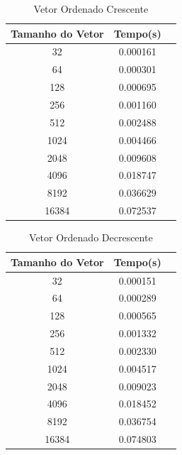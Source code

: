 \documentclass[12pt,a4paper,twoside]{report}
\begin{document}
\begin{table}[h]
  \centering
  \caption{Vetor Ordenado Crescente \label{tab:oc}}
  \begin{tabular}{ccc} \\\hline
  \textbf{Tamanho do Vetor}  & \textbf{Tempo(s)} \\\hline
  32                              & 0.000161          \\\hline
  64                              & 0.000301          \\\hline
  128                             & 0.000695          \\\hline
  256                             & 0.001160          \\\hline
  512                             & 0.002488          \\\hline
  1024                            & 0.004466          \\\hline
  2048                            & 0.009608          \\\hline
  4096                            & 0.018747         \\\hline
  8192                            & 0.036629         \\\hline
  16384                           & 0.072537
  \\\hline
  \end{tabular}
\end{table}


\begin{table}[h]
  \centering
  \caption{Vetor Ordenado Decrescente \label{tab:od}}
  \begin{tabular}{ccc} \\\hline
  \textbf{Tamanho do Vetor}  & \textbf{Tempo(s)} \\\hline
  32                              & 0.000151          \\\hline
  64                              & 0.000289          \\\hline
  128                             & 0.000565          \\\hline
  256                             & 0.001332          \\\hline
  512                             & 0.002330          \\\hline
  1024                            & 0.004517          \\\hline
  2048                            & 0.009023          \\\hline
  4096                            & 0.018452         \\\hline
  8192                            & 0.036754         \\\hline
  16384                           & 0.074803
  \\\hline
  \end{tabular}
\end{table}
\end{document}
